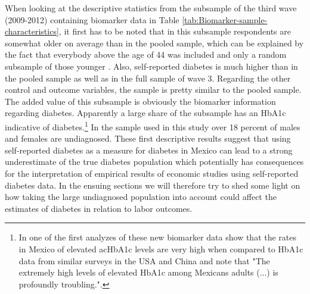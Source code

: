 \documentclass[12pt,english,british]{article}
\begin{document}
When looking at the descriptive statistics from the subsample of the third wave (2009-2012) containing biomarker data in Table \ref{tab:Biomarker-sample-characteristics}, it first has to be noted that in this subsample respondents are somewhat older on average than in the pooled sample, which can be explained by the fact that everybody above the age of 44 was included and only a random subsample of those younger \cite{Crimmins2015}. Also, self-reported diabetes is much higher than in the pooled sample as well as in the full sample of wave 3. Regarding the other control and outcome variables, the sample is pretty similar to the pooled sample. The added value of this subsample is obviously the biomarker information regarding diabetes. Apparently a large share of the subsample has an \ac{HbA1c} indicative of diabetes.\footnote{In one of the first analyzes of these new biomarker data \citet{Frankenberg2015} show that the rates in Mexico of elevated ac{HbA1c} levels are very high when compared to \ac{HbA1c} data from similar surveys in the \ac{USA} and China and note that "The extremely high levels of elevated HbA1c among Mexicans adults (...) is profoundly troubling.".} In the sample used in this study over 18 percent of males and females are undiagnosed. These first descriptive results suggest that using self-reported diabetes as a measure for diabetes in Mexico can lead to a strong underestimate of the true diabetes population which potentially has consequences for the interpretation of empirical results of economic studies using self-reported diabetes data. In the ensuing sections we will therefore try to shed some light on how taking the large undiagnosed population into account could affect the estimates of diabetes in relation to labor outcomes. 
\end{document}
